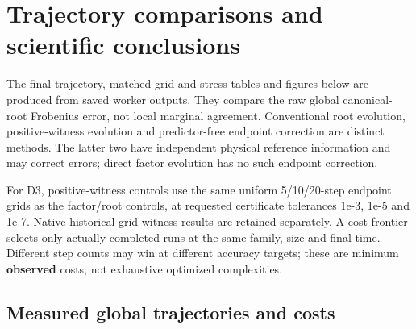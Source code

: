 \documentclass[10pt]{article}
\begin{document}
\section*{Trajectory comparisons and scientific conclusions}

The final trajectory, matched-grid and stress tables and figures below are
produced from saved worker outputs. They compare the raw global canonical-root
Frobenius error, not local marginal agreement. Conventional root evolution,
positive-witness evolution and predictor-free endpoint correction are distinct
methods. The latter two have independent physical reference information and
may correct errors; direct factor evolution has no such endpoint correction.

For D3, positive-witness controls use the same uniform 5/10/20-step endpoint
grids as the factor/root controls, at requested certificate tolerances
1e-3, 1e-5 and 1e-7. Native historical-grid witness results are retained separately.
A cost frontier selects only actually completed runs at the same family, size
and final time. Different step counts may win at different accuracy targets;
these are minimum \textbf{observed} costs, not exhaustive optimized complexities.

\subsection*{Measured global trajectories and costs}
\end{document}
